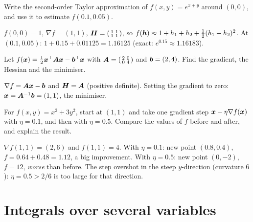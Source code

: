 \sectionexercises

\begin{exercise}
Write the second-order Taylor approximation of $f(x, y) = e^{x + y}$ around
$(0, 0)$, and use it to estimate $f(0.1, 0.05)$.
\end{exercise}
\begin{solution}
$f(0,0) = 1$, $\nabla f = (1, 1)$, $\bm{H} = \left(\begin{smallmatrix} 1 & 1\\ 1 &
1\end{smallmatrix}\right)$, so $f(\bm{h}) \approx 1 + h_1 + h_2 +
\tfrac12(h_1 + h_2)^2$. At $(0.1, 0.05)$: $1 + 0.15 + 0.01125 = 1.16125$ (exact:
$e^{0.15} \approx 1.16183$).
\end{solution}

\begin{exercise}
Let $f(\bm{x}) = \frac12\bm{x}^\top\bm{A}\bm{x} - \bm{b}^\top\bm{x}$ with
$\bm{A} = \left(\begin{smallmatrix} 2 & 0\\ 0 & 4\end{smallmatrix}\right)$ and
$\bm{b} = (2, 4)$. Find the gradient, the Hessian and the minimiser.
\end{exercise}
\begin{solution}
$\nabla f = \bm{A}\bm{x} - \bm{b}$ and $\bm{H} = \bm{A}$ (positive definite). Setting the
gradient to zero: $\bm{x} = \bm{A}^{-1}\bm{b} = (1, 1)$, the minimiser.
\end{solution}

\begin{exercise}
For $f(x, y) = x^2 + 3y^2$, start at $(1, 1)$ and take one gradient step
$\bm{x} - \eta\nabla f(\bm{x})$ with $\eta = 0.1$, and then with $\eta = 0.5$. Compare
the values of $f$ before and after, and explain the result.
\end{exercise}
\begin{solution}
$\nabla f(1, 1) = (2, 6)$ and $f(1,1) = 4$. With $\eta = 0.1$: new point
$(0.8, 0.4)$, $f = 0.64 + 0.48 = 1.12$, a big improvement. With $\eta = 0.5$:
new point $(0, -2)$, $f = 12$, \emph{worse} than before. The step overshot in the
steep $y$-direction (curvature $6$): $\eta = 0.5 > 2/6$ is too large for that
direction.
\end{solution}

\section{Integrals over several variables}\label{sec:double-integrals}

